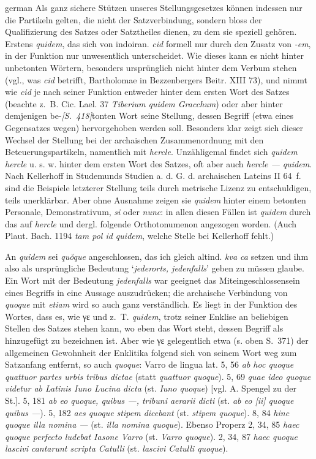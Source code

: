 \begin{otherlanguage*}{german}
Als ganz sichere Stützen unseres Stellungsgesetzes können indessen nur die Partikeln gelten, die nicht der Satzverbindung, sondern bloss der Qualifizierung des Satzes oder Satztheiles dienen, zu dem sie speziell gehören. Erstens \emph{quidem}, das sich von indoiran. \emph{cid} formell nur durch den Zusatz von \emph{-em}, in der Funktion nur unwesentlich unterscheidet. Wie dieses kann es nicht hinter unbetonten Wörtern, besonders ursprünglich nicht hinter dem Verbum stehen (vgl., was \emph{cid} betrifft, Bartholomae in Bezzenbergers Beitr. XIII 73), und nimmt wie \emph{cid} je nach seiner Funktion entweder hinter dem ersten Wort des Satzes (beachte z.~B. Cic. Lael. 37 \emph{Tiberium quidem Gracchum}) oder aber hinter demjenigen be-\hypertarget{p418}{\emph{[S.~418]}}\label{p418}tonten Wort seine Stellung, dessen Begriff (etwa eines Gegensatzes wegen) hervorgehoben werden soll. Besonders klar zeigt sich dieser Wechsel der Stellung bei der archaischen Zusammenordnung mit den Beteuerungspartikeln, namentlich mit \emph{hercle}. Unzähligemal findet sich \emph{quidem hercle} u. s. w. hinter dem ersten Wort des Satzes, oft aber auch \emph{hercle — quidem}. Nach Kellerhoff in Studemunds Studien a. d. G. d. archaischen Lateins II 64~f. sind die Beispiele letzterer Stellung teils durch metrische Lizenz zu entschuldigen, teils unerklärbar. Aber ohne Ausnahme zeigen sie \emph{quidem} hinter einem betonten Personale, Demonstrativum, \emph{si} oder \emph{nunc}: in allen diesen Fällen ist \emph{quidem} durch das auf \emph{hercle} und dergl. folgende Orthotonumenon angezogen worden. (Auch Plaut. Bach. 1194 \emph{tam pol id quidem}, welche Stelle bei Kellerhoff fehlt.)

An \emph{quidem} sei \emph{quŏque} angeschlossen, das ich gleich altind. \emph{kva ca} setzen und ihm also als ursprüngliche Bedeutung ‘\emph{jederorts, jedenfalls}’ geben zu müssen glaube. Ein Wort mit der Bedeutung \emph{jedenfalls} war geeignet das Miteingeschlossensein eines Begriffs in eine Aussage auszudrücken; die archaische Verbindung von \emph{quoque} mit \emph{etiam} wird so auch ganz verständlich. Es liegt in der Funktion des Wortes, dass es, wie γε und z.~T. \emph{quidem}, trotz seiner Enklise an beliebigen Stellen des Satzes stehen kann, wo eben das Wort steht, dessen Begriff als hinzugefügt zu bezeichnen ist. Aber wie γε gelegentlich etwa (s. oben S.~371) der allgemeinen Gewohnheit der Enklitika folgend sich von seinem Wort weg zum Satzanfang entfernt, so auch \emph{quoque}: Varro de lingua lat. 5, 56 \emph{ab hoc quoque quattuor partes urbis tribus dictae} (statt \emph{quattuor quoque}). 5, 69 \emph{quae ideo quoque videtur ab Latinis Iuno Lucina dicta} (st. \emph{Iuno quoque}) [vgl. A. Spengel zu der St.]. 5, 181 \emph{ab eo quoque, quibus —, tribuni aerarii dicti} (st. \emph{ab eo [ii] quoque quibus —}). 5, 182 \emph{aes quoque stipem dicebant} (st. \emph{stipem quoque}). 8, 84 \emph{hinc quoque illa nomina —} (st. \emph{illa nomina quoque}). Ebenso Properz 2, 34, 85 \emph{haec quoque perfecto ludebat Iasone Varro} (st. \emph{Varro quoque}). 2, 34, 87 \emph{haec quoque lascivi cantarunt scripta Catulli} (st. \emph{lascivi Catulli quoque}).


\end{otherlanguage*}
